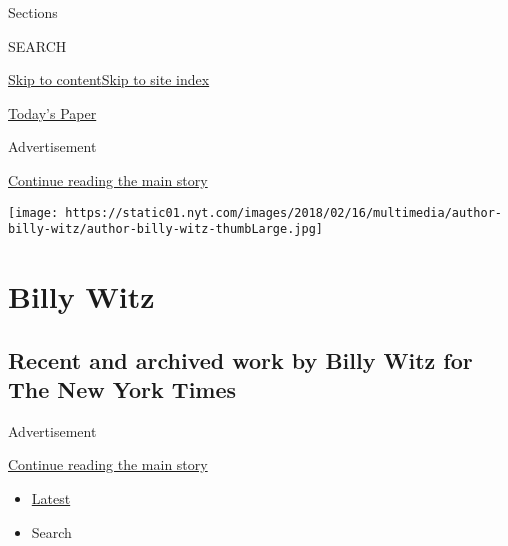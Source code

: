 Sections

SEARCH

\protect\hyperlink{site-content}{Skip to
content}\protect\hyperlink{site-index}{Skip to site index}

\href{https://myaccount.nytimes.com/auth/login?response_type=cookie\&client_id=vi}{}

\href{https://www.nytimes.com/section/todayspaper}{Today's Paper}

Advertisement

\protect\hyperlink{after-top}{Continue reading the main story}

\texttt{[image: https://static01.nyt.com/images/2018/02/16/multimedia/author-billy-witz/author-billy-witz-thumbLarge.jpg]}

\hypertarget{billy-witz}{%
\section{Billy Witz}\label{billy-witz}}

\hypertarget{recent-and-archived-work-by-billy-witz-for-the-new-york-times}{%
\subsection{Recent and archived work by Billy Witz for The New York
Times}\label{recent-and-archived-work-by-billy-witz-for-the-new-york-times}}

Advertisement

\protect\hyperlink{after-mid1}{Continue reading the main story}

\begin{itemize}
\tightlist
\item
  \protect\hyperlink{stream-panel}{Latest}
\item
  Search
\end{itemize}

